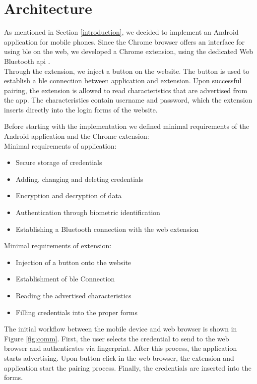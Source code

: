 \section{Architecture} \label{architecture}
As mentioned in Section \ref{introduction}, we decided to implement an Android application for mobile phones. Since the Chrome browser offers an interface for using \gls{ble} on the web, we developed a Chrome extension, using the dedicated Web Bluetooth \gls{api} \cite{WebBTAPI}. \\
Through the extension, we inject a button on the website. The button is used to establish a \gls{ble} connection between application and extension. Upon successful pairing, the extension is allowed to read characteristics that are advertised from the app. The characteristics contain username and password, which the extension inserts directly into the login forms of the website.

\noindent Before starting with the implementation we defined minimal requirements of the Android application and the Chrome extension: \\

\noindent Minimal requirements of application:
\begin{itemize}
\item Secure storage of credentials
\item Adding, changing and deleting credentials
\item Encryption and decryption of data 
\item Authentication through biometric identification
\item Establishing a Bluetooth connection with the web extension
\end{itemize}
\vspace{0.3cm}
\noindent Minimal requirements of extension:
\begin{itemize}
\item Injection of a button onto the website
\item Establishment of \gls{ble} Connection
\item Reading the advertised characteristics
\item Filling credentials into the proper forms
\end{itemize}

The initial workflow between the mobile device and web browser is shown in Figure \ref{fig:comm}. First, the user selects the credential to send to the web browser and authenticates via fingerprint. After this process, the application starts advertising. Upon button click in the web browser, the extension and application start the pairing process. Finally, the credentials are inserted into the forms. \\


